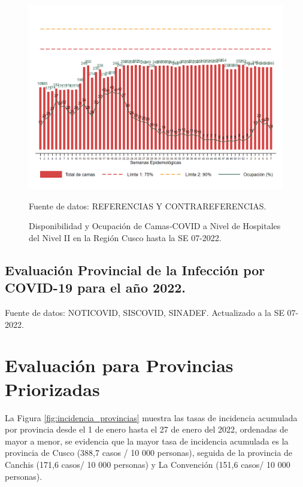 \documentclass[12pt,a4paper,openany]{book}
\begin{document}
\begin{figure}[h]
	\caption{Disponibilidad y Ocupación de Camas-COVID a Nivel de Hospitales del Nivel II en la Región Cusco hasta la SE 07-2022.}\label{fig:ocupacion_2nivel}
	\begin{center}
		\includegraphics[width=0.95\linewidth]{../figuras/nivel_2.png}
	\end{center}
	{\footnotesize {Fuente de datos: REFERENCIAS Y CONTRAREFERENCIAS.}}
\end{figure}
\clearpage
\begin{landscape}
	
	\subsection*{Evaluación Provincial de la Infección por COVID-19 para el año 2022.} 
	
	
	
	
	{\footnotesize Fuente de datos: NOTICOVID, SISCOVID, SINADEF. Actualizado a la SE 07-2022.}
	
	\noindent 
	
\end{landscape}


\clearpage

	\section*{Evaluación para Provincias Priorizadas}
\noindent La Figura \ref{fig:incidencia_provincias} muestra las tasas de incidencia acumulada por provincia desde el 1 de enero hasta el 27 de enero del 2022, ordenadas de mayor a menor, se evidencia que la mayor tasa de incidencia acumulada es la provincia de Cusco (388,7 casos / 10 000 personas), seguida de la provincia de Canchis (171,6 casos/ 10 000 personas)  y La Convención (151,6 casos/ 10 000 personas).
\end{document}
